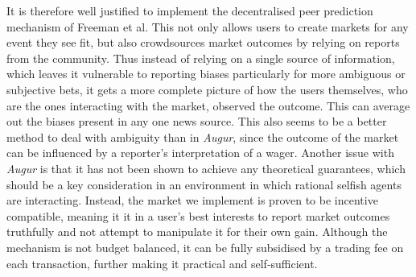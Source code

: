 It is therefore well justified to implement the decentralised peer prediction
mechanism of Freeman et al. This not only allows users to create markets for
any event they see fit, but also crowdsources market outcomes by relying on
reports from the community. Thus instead of relying on a single source of
information, which leaves it vulnerable to reporting biases particularly for
more ambiguous or subjective bets, it gets a more complete picture of how the
users themselves, who are the ones interacting with the market, observed the
outcome. This can average out the biases present in any one news source. This
also seems to be a better method to deal with ambiguity than in \emph{Augur},
since the outcome of the market can be influenced by a reporter's
interpretation of a wager. Another issue with \emph{Augur} is that it has not
been shown to achieve any theoretical guarantees, which should be a key
consideration in an environment in which rational selfish agents are
interacting. Instead, the market we implement is proven to be incentive
compatible, meaning it it in a user's best interests to report market outcomes
truthfully and not attempt to manipulate it for their own gain. Although the
mechanism is not budget balanced, it can be fully subsidised by a trading fee
on each transaction, further making it practical and self-sufficient.
